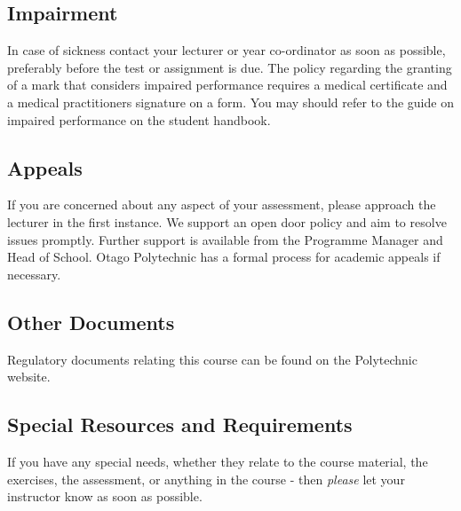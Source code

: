 \documentclass{article}
\begin{document}
\subsection*{Impairment}
In case of sickness contact your lecturer or year co-ordinator as soon as possible, preferably before the test or assignment is due.  The policy regarding the granting of a mark that considers impaired performance requires a medical certificate and a medical practitioners signature on a form. You may should refer to the guide on impaired performance on the student handbook.

\subsection*{Appeals}
If you are concerned about any aspect of your assessment, please approach the lecturer in the first instance.  We support an open door policy and aim to resolve issues promptly.  Further support is available from the Programme Manager and Head of School. Otago Polytechnic has a formal process for academic appeals if necessary.

\subsection*{Other Documents}
Regulatory documents relating this course can be found on the Polytechnic website.

\subsection*{Special Resources and Requirements}
If you have any special needs, whether they relate to the course material, the exercises, the assessment, or anything in the course - then \textit{please} let your instructor know as soon as possible.
\end{document}
